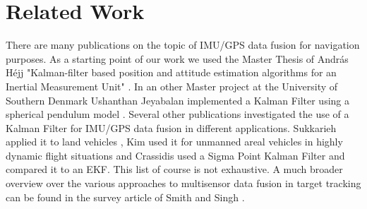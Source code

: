 \section{Related Work}
There are many publications on the topic of IMU/GPS data fusion for navigation purposes. As a starting point of our work we used the Master Thesis of Andr\'{a}s H\'{e}jj "Kalman-filter based position and attitude estimation algorithms for an Inertial Measurement Unit" \cite{hejj}. In an other Master project at the University of Southern Denmark Ushanthan Jeyabalan implemented a Kalman Filter using a spherical pendulum model \cite{ushanthan}.
Several other publications investigated the use of a Kalman Filter for IMU/GPS data fusion in different applications. Sukkarieh applied it to land vehicles \cite{sukkarieh1999}, Kim used it for unmanned areal vehicles in highly dynamic flight situations \cite{kim2006} and Crassidis used a Sigma Point Kalman Filter and compared it to an EKF. This list of course is not exhaustive. A much broader overview over the various approaches to multisensor data fusion in target tracking can be found in the survey article of Smith and Singh \cite{smith2006}.
 




